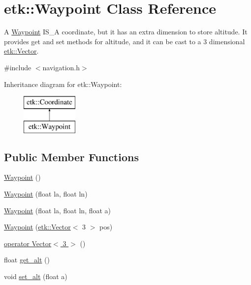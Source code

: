 \hypertarget{classetk_1_1_waypoint}{\section{etk\-:\-:Waypoint Class Reference}
\label{classetk_1_1_waypoint}
}


A \hyperlink{classetk_1_1_waypoint}{Waypoint} I\-S\-\_\-\-A coordinate, but it has an extra dimension to store altitude. It provides get and set methods for altitude, and it can be cast to a 3 dimensional \hyperlink{classetk_1_1_vector}{etk\-::\-Vector}.  




{\ttfamily \#include $<$navigation.\-h$>$}

Inheritance diagram for etk\-:\-:Waypoint\-:\begin{figure}[H]
\begin{center}
\leavevmode
\includegraphics[height=2.000000cm]{classetk_1_1_waypoint}
\end{center}
\end{figure}
\subsection*{Public Member Functions}
\begin{DoxyCompactItemize}
\item 
\hyperlink{classetk_1_1_waypoint_ae32da48fa23083a1e1e185405d9e724d}{Waypoint} ()
\item 
\hyperlink{classetk_1_1_waypoint_abecb90e70b8deacf3f76ccfe63265f58}{Waypoint} (float la, float ln)
\item 
\hyperlink{classetk_1_1_waypoint_a7fdd9bf6ecb548a1e1e06f95d1f6f7d4}{Waypoint} (float la, float ln, float a)
\item 
\hyperlink{classetk_1_1_waypoint_a153e7a17f2de1340493b3f09f3eea3b5}{Waypoint} (\hyperlink{classetk_1_1_vector}{etk\-::\-Vector}$<$ 3 $>$ pos)
\item 
\hyperlink{classetk_1_1_waypoint_a713be7c1b38ef8b77bcdf976caa69aa5}{operator Vector$<$ 3 $>$} ()
\item 
float \hyperlink{classetk_1_1_waypoint_a60478ff0da6acbc2f117ebb47dc3f90e}{get\-\_\-alt} ()
\item 
void \hyperlink{classetk_1_1_waypoint_aeed0028f88e5380a457604c609a7620c}{set\-\_\-alt} (float a)
\end{DoxyCompactItemize}
